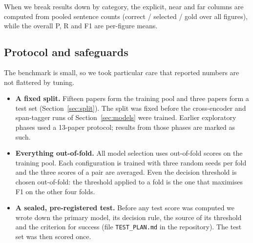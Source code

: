 When we break results down by category, the explicit, near and far columns are computed from pooled sentence
counts (correct / selected / gold over all figures), while the overall P, R and F1 are per-figure means.

\subsection{Protocol and safeguards}
\label{sec:protocol}
The benchmark is small, so we took particular care that reported numbers are not flattered by tuning.
\begin{itemize}
  \item \textbf{A fixed split.} Fifteen papers form the training pool and three papers form a test set
        (Section~\ref{sec:split}). The split was fixed before the cross-encoder and
        span-tagger runs of Section~\ref{sec:models} were trained. Earlier exploratory phases used a 13-paper
        protocol; results from those phases are marked as such.
  \item \textbf{Everything out-of-fold.} All model selection uses out-of-fold scores on the training pool.
        Each configuration is trained with three random seeds per fold and the three scores of a pair are
        averaged. Even the decision threshold is chosen out-of-fold: the threshold applied to a fold is the one
        that maximises F1 on the other four folds.
  \item \textbf{A sealed, pre-registered test.} Before any test score was computed we wrote down the primary
        model, its decision rule, the source of its threshold and the criterion for success
        (file \texttt{TEST\_PLAN.md} in the repository). The test set was then scored once.
\end{itemize}
